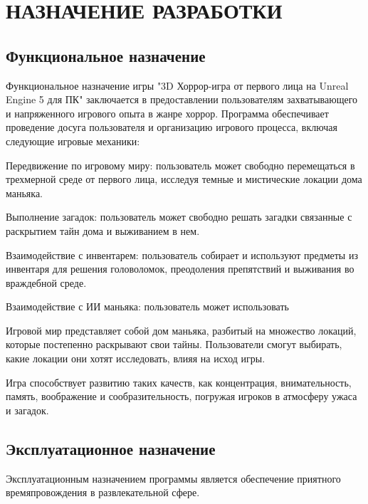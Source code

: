 \section{НАЗНАЧЕНИЕ РАЗРАБОТКИ}

\subsection{Функциональное назначение}

Функциональное назначение игры "3D Хоррор-игра от первого лица на Unreal Engine 5 для ПК" заключается в предоставлении пользователям захватывающего и напряженного игрового опыта в жанре хоррор. Программа обеспечивает проведение досуга пользователя и организацию игрового процесса, включая следующие игровые механики:

Передвижение по игровому миру: пользователь может свободно перемещаться в трехмерной среде от первого лица, исследуя темные и мистические локации дома маньяка.

Выполнение загадок: пользователь может свободно решать загадки связанные с раскрытием тайн дома и выживанием в нем.

Взаимодействие с инвентарем: пользователь собирает и используют предметы из инвентаря для решения головоломок, преодоления препятствий и выживания во враждебной среде.

Взаимодействие с ИИ маньяка: пользователь может использовать 

Игровой мир представляет собой дом маньяка, разбитый на множество локаций, которые постепенно раскрывают свои тайны. Пользователи смогут выбирать, какие локации они хотят исследовать, влияя на исход игры.

Игра способствует развитию таких качеств, как концентрация, внимательность, память, воображение и сообразительность, погружая игроков в атмосферу ужаса и загадок.

\subsection{Эксплуатационное назначение}

Эксплуатационным назначением программы является обеспечение приятного
времяпровождения в развлекательной сфере.
